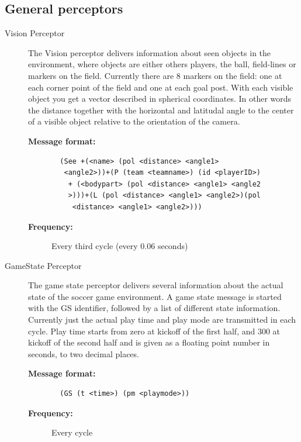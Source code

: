\subsection{General perceptors}
\begin{description}
  \item [Vision Perceptor]
  The Vision perceptor delivers information about seen objects in the environment, where objects are either others players, the ball, field-lines or markers on the field. Currently there are 8 markers on the field: one at each corner point of the field and one at each goal post. With each visible object you get a vector described in spherical coordinates. In other words the distance together with the horizontal and latitudal angle to the center of a visible object relative to the orientation of the camera.
 \begin{description}
  \item[{\bf Message format:}]
  \begin{verbatim}
  (See +(<name> (pol <distance> <angle1>
   <angle2>))+(P (team <teamname>) (id <playerID>)
    + (<bodypart> (pol <distance> <angle1> <angle2
    >)))+(L (pol <distance> <angle1> <angle2>)(pol
     <distance> <angle1> <angle2>)))
  \end{verbatim}
  \item[{\bf Frequency:}]
 Every third cycle (every 0.06 seconds)
  \end{description}





  \item [GameState Perceptor]
  The game state perceptor delivers several information about the actual state of the soccer game environment. A game state message is started with the GS identifier, followed by a list of different state information. Currently just the actual play time and play mode are transmitted in each cycle. Play time starts from zero at kickoff of the first half, and 300 at kickoff of the second half and is given as a floating point number in seconds, to two decimal places.
     \begin{description}
  \item[{\bf Message format:}]
  \begin{verbatim}
  (GS (t <time>) (pm <playmode>))
  \end{verbatim}
  \item[{\bf Frequency:}]
 Every cycle
  \end{description}






\end{description}
